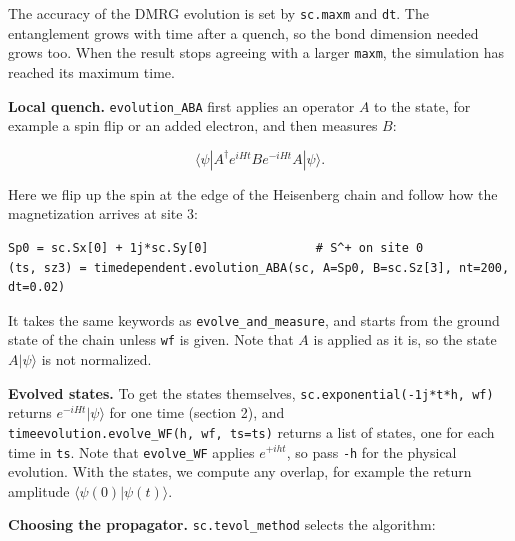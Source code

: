 \documentclass[11pt]{article}
\begin{document}
The accuracy of the DMRG evolution is set by \texttt{sc.\allowbreak{}maxm} and \texttt{dt}. The
entanglement grows with time after a quench, so the bond dimension needed
grows too. When the result stops agreeing with a larger \texttt{maxm}, the
simulation has reached its maximum time.

\textbf{Local quench.} \texttt{evolution\_\allowbreak{}ABA} first applies an operator \(A\) to the
state, for example a spin flip or an added electron, and then measures \(B\):

\[\langle\psi|A^\dagger e^{iHt}Be^{-iHt}A|\psi\rangle.\]

Here we flip up the spin at the edge of the Heisenberg chain and follow
how the magnetization arrives at site 3:

\begin{lstlisting}
Sp0 = sc.Sx[0] + 1j*sc.Sy[0]               # S^+ on site 0
(ts, sz3) = timedependent.evolution_ABA(sc, A=Sp0, B=sc.Sz[3], nt=200, dt=0.02)
\end{lstlisting}

It takes the same keywords as \texttt{evolve\_\allowbreak{}and\_\allowbreak{}measure}, and starts from the
ground state of the chain unless \texttt{wf} is given. Note that \(A\) is applied as
it is, so the state \(A|\psi\rangle\) is not normalized.

\textbf{Evolved states.} To get the states themselves, \texttt{sc.\allowbreak{}exponential(-1j*t*h,\ wf)} returns \(e^{-iHt}|\psi\rangle\) for one time (section 2), and
\texttt{timeevolution.\allowbreak{}evolve\_\allowbreak{}WF(h,\ wf,\ ts=ts)} returns a list of states, one for
each time in \texttt{ts}. Note that \texttt{evolve\_\allowbreak{}WF} applies \(e^{+iht}\), so pass \texttt{-h}
for the physical evolution. With the states, we compute any overlap, for
example the return amplitude \(\langle\psi(0)|\psi(t)\rangle\).

\textbf{Choosing the propagator.} \texttt{sc.\allowbreak{}tevol\_\allowbreak{}method} selects the algorithm:
\end{document}
